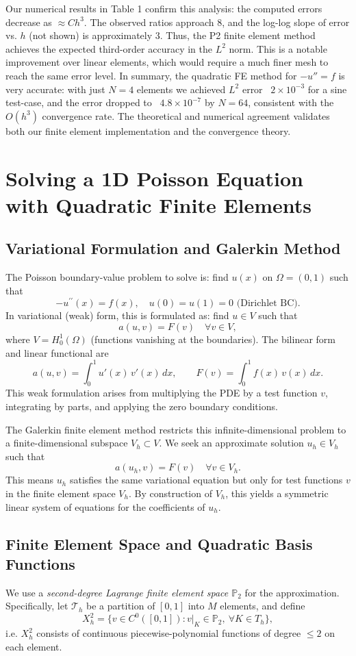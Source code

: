 \documentclass[a4paper,10pt]{article}
\begin{document}
Our numerical results in Table 1 confirm this analysis: the computed errors decrease as $\approx C h^3$. The observed ratios approach 8, and the log-log slope of error vs. $h$ (not shown) is approximately 3. Thus, the P2 finite element method achieves the expected third-order accuracy in the $L^2$ norm. This is a notable improvement over linear elements, which would require a much finer mesh to reach the same error level. In summary, the quadratic FE method for $-u''=f$ is very accurate: with just $N=4$ elements we achieved $L^2$ error ~$2\times10^{-3}$ for a sine test-case, and the error dropped to ~$4.8\times10^{-7}$ by $N=64$, consistent with the $O(h^3)$ convergence rate. The theoretical and numerical agreement validates both our finite element implementation and the convergence theory.

\section[Quadratic FEM for Poisson]{Solving a 1D Poisson Equation with Quadratic Finite Elements}
\subsection{Variational Formulation and Galerkin Method}
The Poisson boundary-value problem to solve is: find \(u(x)\) on \(\Omega=(0,1)\) such that
\[
	-u^{\prime\prime}(x) = f(x), \quad u(0)=u(1)=0 \text{ (Dirichlet BC)}.
\]
In variational (weak) form, this is formulated as: find \(u \in V\) such that
\[
	a(u,v) = F(v) \quad \forall v \in V,
\]
where \(V = H^1_0(\Omega)\) (functions vanishing at the boundaries).
The bilinear form and linear functional are
\[
	a(u,v) = \int_0^1 u'(x)\,v'(x)\,dx, \qquad F(v) = \int_0^1 f(x)\,v(x)\,dx.
\]
This weak formulation arises from multiplying the PDE by a test function \(v\), integrating by parts, and applying the zero boundary conditions.

The Galerkin finite element method restricts this infinite-dimensional problem to a finite-dimensional subspace \(V_h \subset V\).
We seek an approximate solution \(u_h \in V_h\) such that
\[
	a(u_h, v) = F(v) \quad \forall v \in V_h.
\]
This means \(u_h\) satisfies the same variational equation but only for test functions \(v\) in the finite element space \(V_h\). By construction of \(V_h\), this yields a symmetric linear system of equations for the coefficients of \(u_h\).

\subsection{Finite Element Space and Quadratic Basis Functions}
We use a \emph{second-degree Lagrange finite element space \(\mathbb{P}_2\)} for the approximation.
Specifically, let \(\mathcal{T}_h\) be a partition of \([0,1]\) into \(M\) elements, and define
\[
	X_h^2 = \{ v \in C^0([0,1]) : v|_{K} \in \mathbb{P}_2,\ \forall K \in T_h\},
\]
i.e. \(X_h^2\) consists of continuous piecewise-polynomial functions of degree \(\le 2\) on each element.
\end{document}
